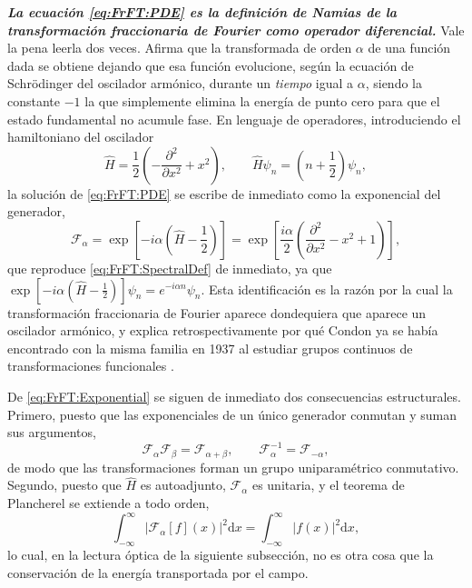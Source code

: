 			\textbf{\textit{La ecuación \eqref{eq:FrFT:PDE} es la definición de Namias de la transformación fraccionaria de Fourier como operador diferencial.}} Vale la pena leerla dos veces. Afirma que la transformada de orden $\alpha$ de una función dada se obtiene dejando que esa función evolucione, según la ecuación de Schrödinger del oscilador armónico, durante un \textit{tiempo} igual a $\alpha$, siendo la constante $-1$ la que simplemente elimina la energía de punto cero para que el estado fundamental no acumule fase. En lenguaje de operadores, introduciendo el hamiltoniano del oscilador
			\begin{equation}\label{eq:FrFT:Hamiltonian}
				\hat{H} = \frac{1}{2}\left(-\frac{\partial^{2}}{\partial x^{2}} + x^{2}\right), \qquad \hat{H}\psi_{n} = \left(n+\frac{1}{2}\right)\psi_{n},
			\end{equation}
			la solución de \eqref{eq:FrFT:PDE} se escribe de inmediato como la exponencial del generador,
			\begin{equation}\label{eq:FrFT:Exponential}
				\mathcal{F}_{\alpha} = \exp\left[-i\alpha\left(\hat{H}-\frac{1}{2}\right)\right] = \exp\left[\frac{i\alpha}{2}\left(\frac{\partial^{2}}{\partial x^{2}} - x^{2} + 1\right)\right],
			\end{equation}
			que reproduce \eqref{eq:FrFT:SpectralDef} de inmediato, ya que $\exp[-i\alpha(\hat{H}-\tfrac{1}{2})]\psi_{n} = e^{-i\alpha n}\psi_{n}$. Esta identificación es la razón por la cual la transformación fraccionaria de Fourier aparece dondequiera que aparece un oscilador armónico, y explica retrospectivamente por qué Condon ya se había encontrado con la misma familia en 1937 al estudiar grupos continuos de transformaciones funcionales \citep{condon1937immersion}.

			De \eqref{eq:FrFT:Exponential} se siguen de inmediato dos consecuencias estructurales. Primero, puesto que las exponenciales de un único generador conmutan y suman sus argumentos,
			\begin{equation}\label{eq:FrFT:GroupExp}
				\mathcal{F}_{\alpha}\mathcal{F}_{\beta} = \mathcal{F}_{\alpha+\beta}, \qquad \mathcal{F}_{\alpha}^{-1} = \mathcal{F}_{-\alpha},
			\end{equation}
			de modo que las transformaciones forman un grupo uniparamétrico conmutativo. Segundo, puesto que $\hat{H}$ es autoadjunto, $\mathcal{F}_{\alpha}$ es unitaria, y el teorema de Plancherel se extiende a todo orden,
			\begin{equation}\label{eq:FrFT:Plancherel}
				\int_{-\infty}^{\infty}\left|\mathcal{F}_{\alpha}[f](x)\right|^{2}\mathrm{d}x = \int_{-\infty}^{\infty}\left|f(x)\right|^{2}\mathrm{d}x,
			\end{equation}
			lo cual, en la lectura óptica de la siguiente subsección, no es otra cosa que la conservación de la energía transportada por el campo.

